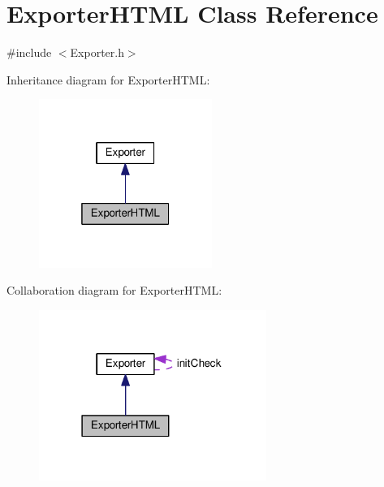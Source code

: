 \hypertarget{class_exporter_h_t_m_l}{}\section{Exporter\+H\+T\+ML Class Reference}
\label{class_exporter_h_t_m_l}


{\ttfamily \#include $<$Exporter.\+h$>$}



Inheritance diagram for Exporter\+H\+T\+ML\+:\nopagebreak
\begin{figure}[H]
\begin{center}
\leavevmode
\includegraphics[width=160pt]{class_exporter_h_t_m_l__inherit__graph}
\end{center}
\end{figure}


Collaboration diagram for Exporter\+H\+T\+ML\+:\nopagebreak
\begin{figure}[H]
\begin{center}
\leavevmode
\includegraphics[width=210pt]{class_exporter_h_t_m_l__coll__graph}
\end{center}
\end{figure}
